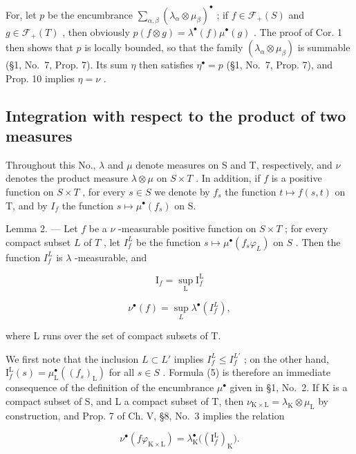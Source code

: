 For, let \(p\) be the encumbrance \(\sum_{\alpha, \beta} (\lambda_{\alpha} \otimes \mu_{\beta})^{\bullet}\) ; if \(f \in \mathcal{F}_{+}(S)\) and \(g \in \mathcal{F}_{+}(T)\) , then obviously \(p(f \otimes g) = \lambda^{\bullet}(f)\mu^{\bullet}(g)\) . The proof of Cor. 1 then shows that \(p\) is locally bounded, so that the family \((\lambda_{\alpha} \otimes \mu_{\beta})\) is summable (§1, No.~7, Prop. 7). Its sum \(\eta\) then satisfies \(\eta^{\bullet} = p\) (§1, No.~7, Prop. 7), and Prop. 10 implies \(\eta = \nu\) .

\subsection{Integration with respect to the product of two measures}

Throughout this No., \(\lambda\) and \(\mu\) denote measures on S and T, respectively, and \(\nu\) denotes the product measure \(\lambda \otimes \mu\) on \(S \times T\) . In addition, if \(f\) is a positive function on \(S \times T\) , for every \(s \in S\) we denote by \(f_s\) the function \(t \mapsto f(s,t)\) on T, and by \(I_f\) the function \(s \mapsto \mu^\bullet(f_s)\) on S.

Lemma 2. --- Let \(f\) be a \(\nu\) -measurable positive function on \(S \times T\) ; for every compact subset \(L\) of \(T\) , let \(I_f^L\) be the function \(s \mapsto \mu^\bullet(f_s \varphi_L)\) on \(S\) . Then the function \(I_f^L\) is \(\lambda\) -measurable, and

\[
\mathrm{I} _ {f} = \sup _ {\mathrm{L}} \mathrm{I} _ {f} ^ {\mathrm{L}}\tag{5}
\]

\[
\nu^ {\bullet} (f) = \sup _ {L} \lambda^ {\bullet} (I _ {f} ^ {L}),\tag{6}
\]

where L runs over the set of compact subsets of T.

We first note that the inclusion \(L \subset L'\) implies \(I_{f}^{L} \leqslant I_{f}^{L'}\) ; on the other hand, \(\mathrm{I}_{f}^{\mathrm{L}}(s) = \mu_{\mathrm{L}}^{\bullet}((f_{s})_{\mathrm{L}})\) for all \(s \in S\) . Formula (5) is therefore an immediate consequence of the definition of the encumbrance \(\mu^{\bullet}\) given in §1, No.~2. If K is a compact subset of S, and L a compact subset of T, then \(\nu_{\mathrm{K} \times \mathrm{L}} = \lambda_{\mathrm{K}} \otimes \mu_{\mathrm{L}}\) by construction, and Prop. 7 of Ch. V, §8, No.~3 implies the relation

\[
\nu^ {\bullet} (f \varphi_ {\mathrm{K} \times \mathrm{L}}) = \lambda_ {\mathrm{K}} ^ {\bullet} \big ((\mathrm{I} _ {f} ^ {\mathrm{L}}) _ {\mathrm{K}} \big).\tag{7}
\]

